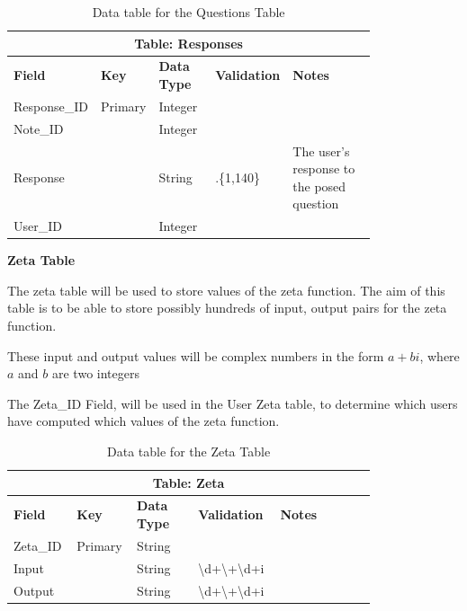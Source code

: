 \documentclass{article}
\begin{document}
\begin{table}[ht]
    \centering
    \begin{tabular}{ | p{0.15\linewidth} | p{0.1\linewidth} | p{0.16\linewidth} | p{0.14\linewidth} | p{0.25\linewidth} | }
    \hline
    \multicolumn{5}{|c|}{\textbf{Table: Responses}}\\
    \hline
    \hline
    \textbf{Field} & \textbf{Key} & \textbf{Data Type} & \textbf{Validation} & \textbf{Notes} \\
    \hline
    Response\_ID & Primary & Integer & & \\
    \hline
    Note\_ID & & Integer & & \\
    \hline
    Response & & String & .\{1,140\} & The user's response to the posed question\\
    \hline
    User\_ID & & Integer & & \\
    \hline
    \end{tabular}
    \caption{Data table for the Questions Table}
\end{table}

\clearpage
\textbf{Zeta Table}

The zeta table will be used to store values of the zeta function. The aim of this table is to be able to store possibly hundreds of input, output pairs for the zeta function.

These input and output values will be complex numbers in the form $a+bi$, where $a$ and $b$ are two integers

The Zeta\_ID Field, will be used in the User Zeta table, to determine which users have computed which values of the zeta function.


\begin{table}[ht]
    \centering
    \begin{tabular}{ | p{0.12\linewidth} | p{0.1\linewidth} | p{0.16\linewidth} | p{0.17\linewidth} | p{0.25\linewidth} | }
    \hline
    \multicolumn{5}{|c|}{\textbf{Table: Zeta}}\\
    \hline
    \hline
    \textbf{Field} & \textbf{Key} & \textbf{Data Type} & \textbf{Validation} & \textbf{Notes} \\
    \hline
    Zeta\_ID & Primary & String & & \\
    \hline
    Input & & String & \textbackslash d+\textbackslash +\textbackslash d+i & \\
    \hline
    Output & & String & \textbackslash d+\textbackslash +\textbackslash d+i & \\
    \hline
    \end{tabular}
    \caption{Data table for the Zeta Table}
\end{table}
\end{document}
